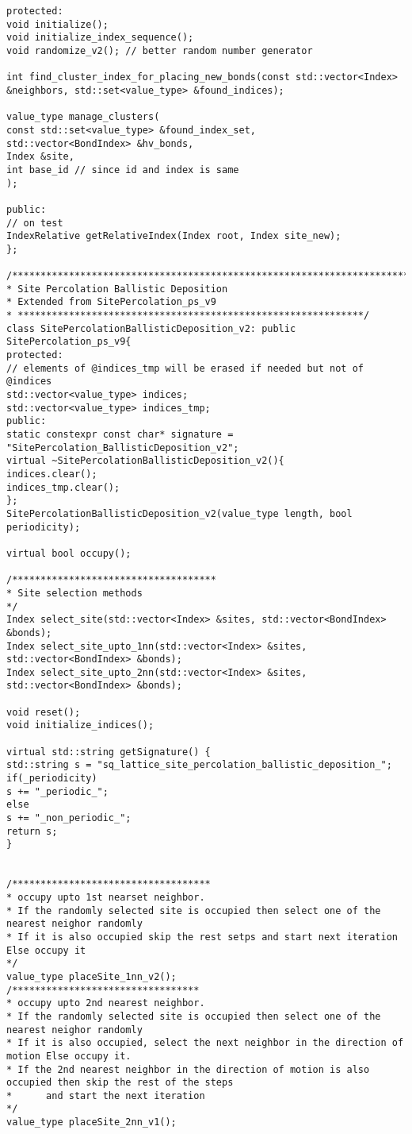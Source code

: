 \begin{lstlisting}[style=CStyle]
protected:
void initialize();
void initialize_index_sequence();
void randomize_v2(); // better random number generator

int find_cluster_index_for_placing_new_bonds(const std::vector<Index> &neighbors, std::set<value_type> &found_indices);

value_type manage_clusters(
const std::set<value_type> &found_index_set,
std::vector<BondIndex> &hv_bonds,
Index &site,
int base_id // since id and index is same
);

public:
// on test
IndexRelative getRelativeIndex(Index root, Index site_new);
};

/*******************************************************************************
* Site Percolation Ballistic Deposition
* Extended from SitePercolation_ps_v9
* *************************************************************/
class SitePercolationBallisticDeposition_v2: public SitePercolation_ps_v9{
protected:
// elements of @indices_tmp will be erased if needed but not of @indices
std::vector<value_type> indices;
std::vector<value_type> indices_tmp;
public:
static constexpr const char* signature = "SitePercolation_BallisticDeposition_v2";
virtual ~SitePercolationBallisticDeposition_v2(){
indices.clear();
indices_tmp.clear();
};
SitePercolationBallisticDeposition_v2(value_type length, bool periodicity);

virtual bool occupy();

/************************************
* Site selection methods
*/
Index select_site(std::vector<Index> &sites, std::vector<BondIndex> &bonds);
Index select_site_upto_1nn(std::vector<Index> &sites, std::vector<BondIndex> &bonds);
Index select_site_upto_2nn(std::vector<Index> &sites, std::vector<BondIndex> &bonds);

void reset();
void initialize_indices();

virtual std::string getSignature() {
std::string s = "sq_lattice_site_percolation_ballistic_deposition_";
if(_periodicity)
s += "_periodic_";
else
s += "_non_periodic_";
return s;
}


/***********************************
* occupy upto 1st nearset neighbor.
* If the randomly selected site is occupied then select one of the nearest neighor randomly
* If it is also occupied skip the rest setps and start next iteration Else occupy it
*/
value_type placeSite_1nn_v2();
/*********************************
* occupy upto 2nd nearest neighbor.
* If the randomly selected site is occupied then select one of the nearest neighor randomly
* If it is also occupied, select the next neighbor in the direction of motion Else occupy it.
* If the 2nd nearest neighbor in the direction of motion is also occupied then skip the rest of the steps
*      and start the next iteration
*/
value_type placeSite_2nn_v1();


\end{lstlisting}
